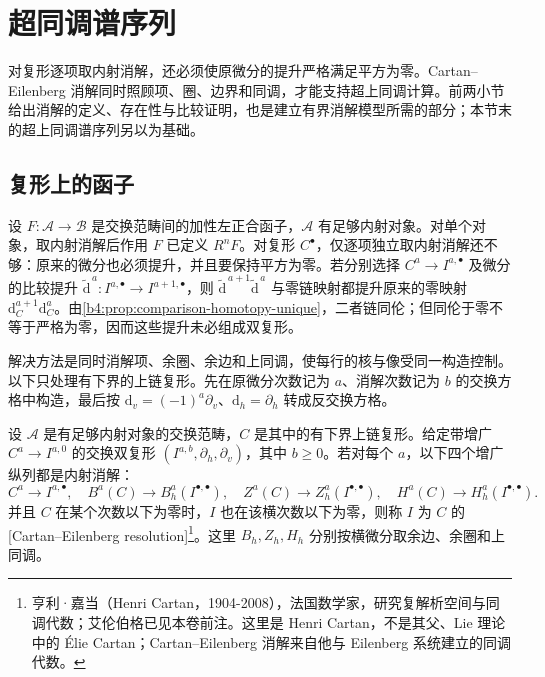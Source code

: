 
\section{超同调谱序列}
\label{b4:sec:1502}

对复形逐项取内射消解，还必须使原微分的提升严格满足平方为零。Cartan--Eilenberg 消解同时照顾项、圈、边界和同调，才能支持超上同调计算。前两小节给出消解的定义、存在性与比较证明，也是建立有界消解模型所需的部分；本节末的超上同调谱序列另以为基础。

%
%

\subsection{复形上的函子}
\label{b4:subsec:1502:01}

设 \(F:\mathcal A\to\mathcal B\) 是交换范畴间的加性左正合函子，\(\mathcal A\) 有足够内射对象。对单个对象，取内射消解后作用 \(F\) 已定义 \(R^nF\)。对复形 \(C^\bullet\)，仅逐项独立取内射消解还不够：原来的微分也必须提升，并且要保持平方为零。若分别选择 \(C^a\to I^{a,\bullet}\) 及微分的比较提升 \(\widetilde{\mathrm d}^{\,a}:I^{a,\bullet}\to I^{a+1,\bullet}\)，则 \(\widetilde{\mathrm d}^{\,a+1}\widetilde{\mathrm d}^{\,a}\) 与零链映射都提升原来的零映射 \(\mathrm d_C^{a+1}\mathrm d_C^a\)。由\cref{b4:prop:comparison-homotopy-unique}，二者链同伦；但同伦于零不等于严格为零，因而这些提升未必组成双复形。

\ProseParagraphBreak
解决方法是同时消解项、余圈、余边和上同调，使每行的核与像受同一构造控制。以下只处理有下界的上链复形。先在原微分次数记为 \(a\)、消解次数记为 \(b\) 的交换方格中构造，最后按 \(\mathrm{d}_v=(-1)^a\partial_v\)、\(\mathrm{d}_h=\partial_h\) 转成反交换方格。

\begin{definition}\label{b4:def:ce-resolution}
	设 \(\mathcal A\) 是有足够内射对象的交换范畴，\(C\) 是其中的有下界上链复形。给定带增广 \(C^a\to I^{a,0}\) 的交换双复形 \((I^{a,b},\partial_h,\partial_v)\)，其中 \(b\ge0\)。若对每个 \(a\)，以下四个增广纵列都是内射消解：
	\[
		C^a\to I^{a,\bullet},\quad B^a(C)\to B_h^a(I^{\bullet,\bullet}),\quad Z^a(C)\to Z_h^a(I^{\bullet,\bullet}),\quad H^a(C)\to H_h^a(I^{\bullet,\bullet}).
	\]
	并且 \(C\) 在某个次数以下为零时，\(I\) 也在该横次数以下为零，则称 \(I\) 为 \(C\) 的[Cartan--Eilenberg resolution]\footnote{亨利·嘉当（Henri Cartan，1904-2008），法国数学家，研究复解析空间与同调代数；艾伦伯格已见本卷前注。这里是 Henri Cartan，不是其父、Lie 理论中的 Élie Cartan；Cartan--Eilenberg 消解来自他与 Eilenberg 系统建立的同调代数。}。这里 \(B_h,Z_h,H_h\) 分别按横微分取余边、余圈和上同调。
\end{definition}

